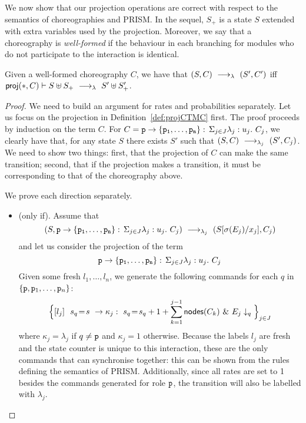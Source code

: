      We now show that our projection operations
    are correct with respect to the semantics of choreographies and
    PRISM. In the sequel, $S_+$ is a state $S$ extended with extra
    variables used by the projection. Moreover, we say that a
    choreography is {\em well-formed} if the behaviour in each
    branching for modules who do not participate to the interaction is
    identical.
      \begin{theorem}[EPP]\label{thm:epp}
        Given a well-formed choreography $C$, we have that
        $(S,C) \ \longrightarrow_{\lambda}\  (S', C')$ iff
        $\mathsf{proj} (*, C)\vdash S\uplus S_{+}\ \longrightarrow_{\lambda}\  S'\uplus S_{+}'$.
      \end{theorem} 
      \begin{proof} We need to build an argument for rates and
        probabilities separately. Let us focus on the projection in
        Definition~\ref{def:projCTMC} first. The proof proceeds by
        induction on the term $C$. For
        $C=\mathtt{p}\rightarrow \{\mathtt{\mathtt{p}_1,\ldots,\mathtt{p}_n}\}:\,\Sigma_{j\in J}\lambda_j: u_j.\ C_j$, we clearly have
        that, for any state $S$ there exists $S'$ such that
        $(S,C)\ \longrightarrow_{\lambda_j}\ (S',C_j)$. We need to show two things:
        first, that the projection of $C$ can make the same
        transition; second, that if the projection makes a transition,
        it must be corresponding to that of the choreography above.



        \newpage We prove each direction separately.
        \begin{itemize}
        \item (only if). Assume that
    $$(S, \mathtt{p}\rightarrow \{\mathtt{\mathtt{p}_1,\ldots,\mathtt{p}_n}\}:\,\Sigma_{j\in J}\lambda_j: u_j.\ C_j)\ \longrightarrow_{\lambda_j}\ (S[\sigma(E_j)/x_j], C_j)$$
    and let us consider the projection of the term
    $$\mathtt{p}\rightarrow \{\mathtt{\mathtt{p}_1,\ldots,\mathtt{p}_n}\}:\,\Sigma_{j\in J}\lambda_j: u_j.\ C_j$$
    Given some fresh $l_1,\ldots, l_n$, we generate the following
    commands for each $q$ in
    $\{\mathtt{p}, \mathtt{p}_1,\ldots,\mathtt{p}_n\}$:
    $$
    \Big\{\commandBase {l_j} {\ s_{q}\!=\! s} {\kappa_j:\ s_{q}\!=\!
      s_{q} +1+\sum_{k=1}^{j-1}\mathsf{nodes}({C_k})}\ \&\ \projE
    {E_j}q\Big\}_{j\in J}
    $$
    where $\kappa_j=\lambda_j$ if $q\neq\mathtt{p}$ and $\kappa_j=1$
    otherwise. 
    Because the labels $l_j$ are fresh and the state counter is unique
    to this interaction, these are the only commands that can
    synchronise together: this can be shown from the rules defining
    the semantics of PRISM. Additionally, since all rates are set to 1
    besides the commands generated for role $\mathtt{p}$, the transition
    will also be labelled with $\lambda_j$.



\end{itemize}
\end{proof}
